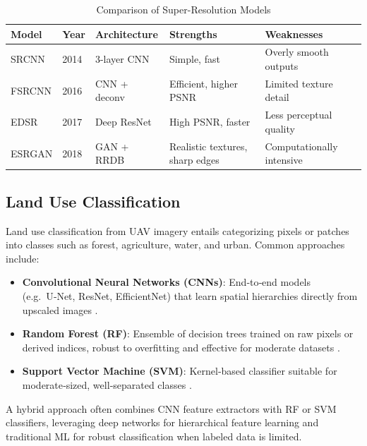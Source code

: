 \begin{table}[H]
\centering
\renewcommand{\arraystretch}{1.2}
\setlength{\tabcolsep}{6pt}
\begin{tabular}{@{} l l p{3cm} p{3cm} p{3cm} @{}}
    \toprule
    \textbf{Model} & \textbf{Year} & \textbf{Architecture} & \textbf{Strengths} & \textbf{Weaknesses} \\
    \midrule
    SRCNN   & 2014 & 3-layer CNN & Simple, fast & Overly smooth outputs \cite{dong2016srcnn} \\
    FSRCNN  & 2016 & CNN + deconv & Efficient, higher PSNR \cite{dong2016srcnn} & Limited texture detail \\
    EDSR    & 2017 & Deep ResNet & High PSNR, faster \cite{lim2017edsr} & Less perceptual quality \\
    ESRGAN  & 2018 & GAN + RRDB & Realistic textures, sharp edges \cite{wang2018esrgan} & Computationally intensive \\
    \bottomrule
  \end{tabular}
  \caption{Comparison of Super-Resolution Models}
\label{tab:sr_models}
\end{table}


\subsection{Land Use Classification}
Land use classification from UAV imagery entails categorizing pixels or patches into classes such as forest, agriculture, water, and urban. Common approaches include:
\begin{itemize}
  \item \textbf{Convolutional Neural Networks (CNNs)}: End‑to‑end models (e.g.\ U‑Net, ResNet, EfficientNet) that learn spatial hierarchies directly from upscaled images \cite{bhuju2019cnn}.
  \item \textbf{Random Forest (RF)}: Ensemble of decision trees trained on raw pixels or derived indices, robust to overfitting and effective for moderate datasets \cite{bhuju2019cnn}\cite{dong2016srcnn}.
  \item \textbf{Support Vector Machine (SVM)}: Kernel‑based classifier suitable for moderate‑sized, well‑separated classes \cite{bhuju2019cnn}\cite{dong2016srcnn}.
\end{itemize}
A hybrid approach often combines CNN feature extractors with RF or SVM classifiers, leveraging deep networks for hierarchical feature learning and traditional ML for robust classification when labeled data is limited.

